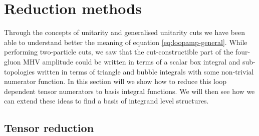 \section{Reduction methods \label{sec:3.4}}

Through the concepts of unitarity and generalised unitarity cuts we have been
able to understand better the meaning of equation \eqref{eq:loopamp-general}.
While performing two-particle cuts, we saw that the cut-constructible part of
the four-gluon MHV amplitude could be written in terms of a scalar box integral
and sub-topologies written in terms of triangle and bubble integrals with some
non-trivial numerator function. In this section will we show how to reduce this
loop dependent tensor numerators to basis integral functions. We will then see how we can extend these ideas to find a basis of integrand level structures. 

\subsection{Tensor reduction}
\label{sec:TensorReduction}

